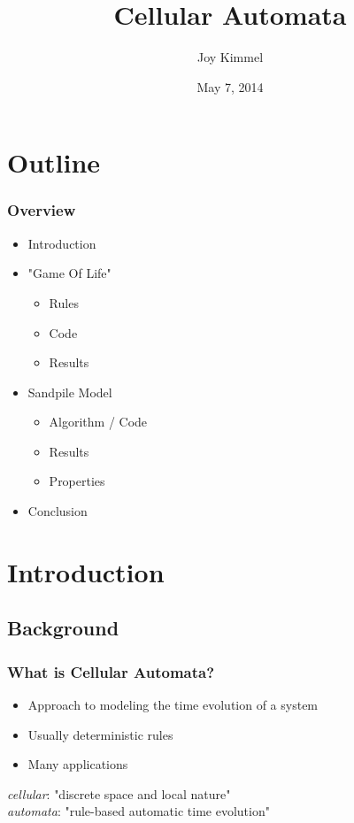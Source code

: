 \documentclass{beamer}
\title{\color{gray}Cellular Automata}
\author{Joy Kimmel}
\date{May 7, 2014}
\institute{Gordon College}
\begin{document}
\frame{\titlepage}

\section{Outline}

\frame
{
\frametitle{Overview}
\begin{itemize}
	\item<1-> Introduction
	\item<2-> "Game Of Life"
		\begin{itemize}
		\item Rules
		\item Code
		\item Results
		\end{itemize}
	\item<3-> Sandpile Model
		\begin{itemize}
		\item Algorithm / Code
		\item Results
		\item Properties
		\end{itemize}
	\item<4-> Conclusion
\end{itemize}
 }
 
\section{Introduction}
\subsection{Background}
\frame
{
  \frametitle{What is Cellular Automata?}

  \begin{itemize}
  	\item Approach to modeling the time evolution of a system
  	\item Usually deterministic rules
	\item Many applications
  \end{itemize}
 
  \begin{definition}
  \textit{cellular}: "discrete space and local nature" \\
  \textit{automata}: "rule-based automatic time evolution"
  \end{definition}
}
\end{document}
